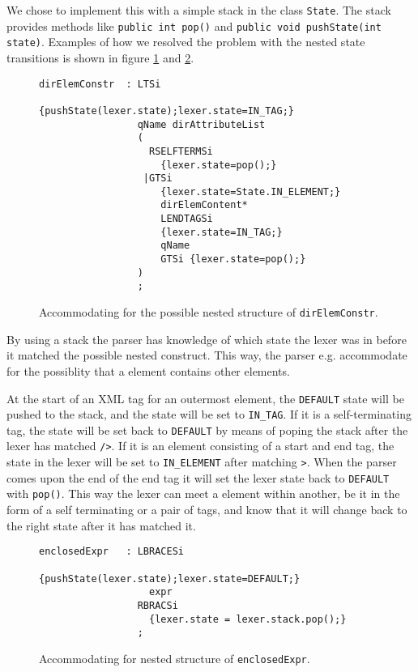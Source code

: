 We chose to implement this with a simple stack in the class \verb!State!. The stack provides methods like \verb!public int pop()! and \verb!public void pushState(int state)!. Examples of how we resolved the problem with the nested state transitions is shown in figure \ref{fig:nestedTransitionElement} and \ref{fig:nestedTransitionExpr}.

\begin{figure}[h!]
\begin{Verbatim}
dirElemConstr  : LTSi 
                  {pushState(lexer.state);lexer.state=IN_TAG;}
                 qName dirAttributeList
                 (
                   RSELFTERMSi
                     {lexer.state=pop();}
                  |GTSi 
                     {lexer.state=State.IN_ELEMENT;}
                     dirElemContent* 
                     LENDTAGSi 
                     {lexer.state=IN_TAG;}
                     qName 
                     GTSi {lexer.state=pop();}
                 )
                 ;
\end{Verbatim}
\caption[Accommodating for a nested structure of \texttt{dirElemConstr}]{Accommodating for the possible nested structure of \texttt{dirElemConstr}.}
\label{fig:nestedTransitionElement}
\end{figure}


By using a stack the parser has knowledge of which state the lexer was in before it matched the possible nested construct. This way, the parser e.g. accommodate for the possiblity that a element contains other elements.

At the start of an XML tag for an outermost element, the \verb!DEFAULT! state will be pushed to the stack, and the state will be set to \verb!IN_TAG!. If it is a self-terminating tag, the state will be set back to \verb!DEFAULT! by means of poping the stack after the lexer has matched \verb!/>!. If it is an element consisting of a start and end tag, the state in the lexer will be set to \verb!IN_ELEMENT! after matching \verb!>!. When the parser comes upon the end of the end tag it will set the lexer state back to \verb!DEFAULT! with \verb!pop()!. This way the lexer can meet a element within another, be it in the form of a self terminating or a pair of tags, and know that it will change back to the right state after it has matched it.


\begin{figure}[h!]
\begin{Verbatim}
enclosedExpr   : LBRACESi 
                   {pushState(lexer.state);lexer.state=DEFAULT;}
                   expr 
                 RBRACSi 
                   {lexer.state = lexer.stack.pop();}
                 ;
\end{Verbatim}
\caption[Accommodating for nested structure of \texttt{enclosedExpr}]{Accommodating for nested structure of \texttt{enclosedExpr}.}
\label{fig:nestedTransitionExpr}
\end{figure}

